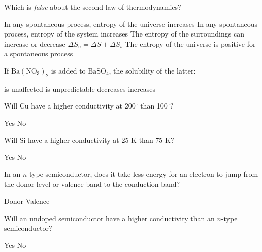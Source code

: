 \documentclass[answers]{exam}
\begin{document}
\begin{multicols}{2}
\begin{questions}
\question Which is \emph{false} about the second law of thermodynamics?

\begin{choices}
  \choice In any spontaneous process, entropy of the universe increases
  \CorrectChoice In any spontaneous process, entropy of the system increases
  \choice The entropy of the surroundings can increase or decrease
  \choice $\Delta S_u = \Delta S + \Delta S_s$
  \choice The entropy of the universe is positive for a spontaneous process
\end{choices}

\question If $\mathrm{Ba(NO_3)_2}$ is added to $\mathrm{BaSO_4}$, the solubility of the latter:

\begin{choices}
  \choice is unaffected
  \choice is unpredictable
  \CorrectChoice decreases
  \choice increases
\end{choices}

\question Will Cu have a higher conductivity at 200$^\circ$ than 100$^\circ$?

\begin{oneparchoices}
  \choice Yes
  \CorrectChoice No
\end{oneparchoices}

\question Will Si have a higher conductivity at 25 K than 75 K?

\begin{oneparchoices}
  \choice Yes
  \CorrectChoice No
\end{oneparchoices}

\question In an $n$-type semiconductor, does it take less energy for an electron to jump from the donor level or valence band to the conduction band?

\begin{oneparchoices}
  \CorrectChoice Donor
  \choice Valence
\end{oneparchoices}

\question Will an undoped semiconductor have a higher conductivity than an $n$-type semiconductor?

\begin{oneparchoices}
  \choice Yes
  \CorrectChoice No
\end{oneparchoices}


\end{questions}
\end{multicols}

\end{document}
